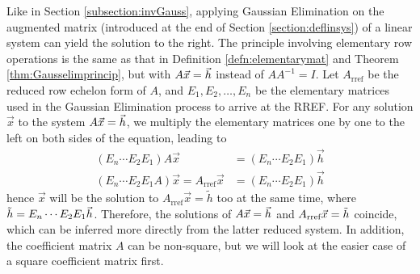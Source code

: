 Like in Section \ref{subsection:invGauss}, applying Gaussian Elimination on the augmented matrix (introduced at the end of Section \ref{section:deflinsys}) of a linear system can yield the solution to the right. The principle involving elementary row operations is the same as that in Definition \ref{defn:elementarymat} and Theorem \ref{thm:Gausselimprincip}, but with $A\vec{x} = \smash{\vec{h}}$ instead of $AA^{-1} = I$. Let $A_{\text{rref}}$ be the reduced row echelon form of $A$, and $E_1, E_2, \ldots, E_n$ be the elementary matrices used in the Gaussian Elimination process to arrive at the RREF. For any solution $\vec{x}$ to the system $A\vec{x} = \smash{\vec{h}}$, we multiply the elementary matrices one by one to the left on both sides of the equation, leading to
\begin{align}
(E_n\cdots E_2E_1)A\vec{x} &= (E_n\cdots E_2E_1)\vec{h} \nonumber \\
(E_n\cdots E_2E_1A)\vec{x} = A_{\text{rref}}\vec{x} &= (E_n\cdots E_2E_1)\vec{h} 
\end{align}
hence $\vec{x}$ will be the solution to $A_{\text{rref}}\vec{x} = \tilde{h}$ too at the same time, where $\smash{\tilde{h}} = E_n\cdots E_2E_1\smash{\vec{h}}$. Therefore, the solutions of $A\vec{x} = \smash{\vec{h}}$ and $A_{\text{rref}}\vec{x} = \smash{\tilde{h}}$ coincide, which can be inferred more directly from the latter reduced system. In addition, the coefficient matrix $A$ can be non-square, but we will look at the easier case of a square coefficient matrix first.

